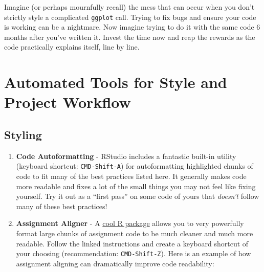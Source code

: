 \documentclass[]{book}
\begin{document}
Imagine (or perhaps mournfully recall) the mess that can occur when you don't strictly style a complicated \texttt{ggplot} call. Trying to fix bugs and ensure your code is working can be a nightmare. Now imagine trying to do it with the same code 6 months after you've written it. Invest the time now and reap the rewards as the code practically explains itself, line by line.

\hypertarget{automated-tools-for-style-and-project-workflow}{%
\section{Automated Tools for Style and Project Workflow}\label{automated-tools-for-style-and-project-workflow}}

\hypertarget{styling}{%
\subsection{Styling}\label{styling}}

\begin{enumerate}
\def\labelenumi{\arabic{enumi}.}
\item
  \textbf{Code Autoformatting} - RStudio includes a fantastic built-in utility (keyboard shortcut: \texttt{CMD-Shift-A}) for autoformatting highlighted chunks of code to fit many of the best practices listed here. It generally makes code more readable and fixes a lot of the small things you may not feel like fixing yourself. Try it out as a ``first pass'' on some code of yours that \emph{doesn't} follow many of these best practices!
\item
  \textbf{Assignment Aligner} - A \href{https://www.r-bloggers.com/align-assign-rstudio-addin-to-align-assignment-operators/}{cool R package} allows you to very powerfully format large chunks of assignment code to be much cleaner and much more readable. Follow the linked instructions and create a keyboard shortcut of your choosing (recommendation: \texttt{CMD-Shift-Z}). Here is an example of how assignment aligning can dramatically improve code readability:
\end{enumerate}
\end{document}
